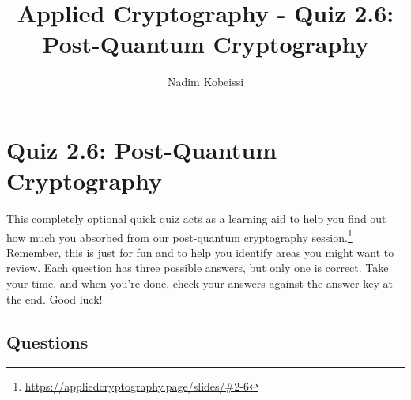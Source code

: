 \documentclass[10pt,a4paper,american]{exam}
\title{Applied Cryptography - Quiz 2.6: Post-Quantum Cryptography}
\author{Nadim Kobeissi}
\begin{document}
\classhandoutheader
\section*{Quiz 2.6: Post-Quantum Cryptography}

\begin{tcolorbox}[colframe=OliveGreen!30!white,colback=OliveGreen!5!white]
	This completely optional quick quiz acts as a learning aid to help you find out how much you absorbed from our post-quantum cryptography session.\footnote{\url{https://appliedcryptography.page/slides/\#2-6}} Remember, this is just for fun and to help you identify areas you might want to review. Each question has three possible answers, but only one is correct. Take your time, and when you're done, check your answers against the answer key at the end. Good luck!
\end{tcolorbox}

\subsection*{Questions}
\end{document}
